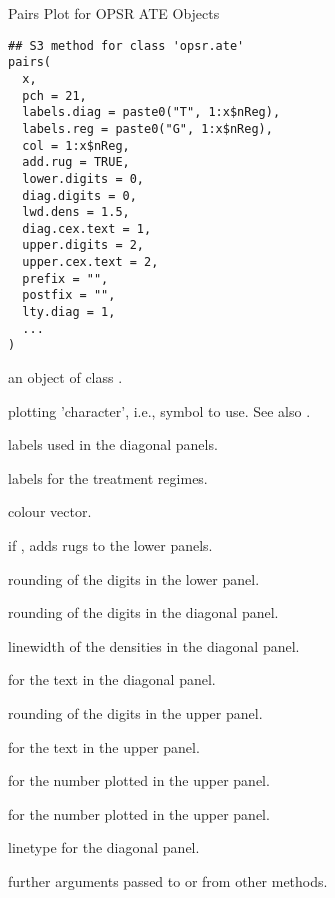 
%
\begin{Description}
Pairs Plot for OPSR ATE Objects
\end{Description}
%
\begin{Usage}
\begin{verbatim}
## S3 method for class 'opsr.ate'
pairs(
  x,
  pch = 21,
  labels.diag = paste0("T", 1:x$nReg),
  labels.reg = paste0("G", 1:x$nReg),
  col = 1:x$nReg,
  add.rug = TRUE,
  lower.digits = 0,
  diag.digits = 0,
  lwd.dens = 1.5,
  diag.cex.text = 1,
  upper.digits = 2,
  upper.cex.text = 2,
  prefix = "",
  postfix = "",
  lty.diag = 1,
  ...
)
\end{verbatim}
\end{Usage}
%
\begin{Arguments}
\begin{ldescription}
\item[\code{x}] an object of class .

\item[\code{pch}] plotting 'character', i.e., symbol to use. See also .

\item[\code{labels.diag}] labels used in the diagonal panels.

\item[\code{labels.reg}] labels for the treatment regimes.

\item[\code{col}] colour vector.

\item[\code{add.rug}] if , adds rugs to the lower panels.

\item[\code{lower.digits}] rounding of the digits in the lower panel.

\item[\code{diag.digits}] rounding of the digits in the diagonal panel.

\item[\code{lwd.dens}] linewidth of the densities in the diagonal panel.

\item[\code{diag.cex.text}]  for the text in the diagonal panel.

\item[\code{upper.digits}] rounding of the digits in the upper panel.

\item[\code{upper.cex.text}]  for the text in the upper panel.

\item[\code{prefix}] for the number plotted in the upper panel.

\item[\code{postfix}] for the number plotted in the upper panel.

\item[\code{lty.diag}] linetype for the diagonal panel.

\item[\code{...}] further arguments passed to or from other methods.
\end{ldescription}
\end{Arguments}
